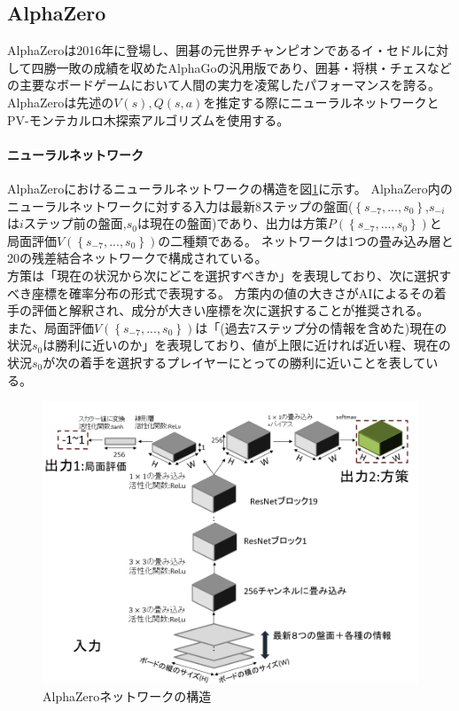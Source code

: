 \subsection{AlphaZero}
AlphaZeroは2016年に登場し、囲碁の元世界チャンピオンであるイ・セドルに対して四勝一敗の成績を収めたAlphaGoの汎用版であり、囲碁・将棋・チェスなどの主要なボードゲームにおいて人間の実力を凌駕したパフォーマンスを誇る。
AlphaZeroは先述の$V(s),Q(s, a)$を推定する際にニューラルネットワークとPV-モンテカルロ木探索アルゴリズムを使用する。
\paragraph{ニューラルネットワーク}
AlphaZeroにおけるニューラルネットワークの構造を図\ref{fig:network}に示す。
AlphaZero内のニューラルネットワークに対する入力は最新$8$ステップの盤面($\left\{ s_{-7}, ..., s_0 \right\}$,$s_{-i}$は$i$ステップ前の盤面,$s_{0}$は現在の盤面)であり、出力は方策$P(\left\{ s_{-7}, ..., s_0 \right\})$と
局面評価$V(\left\{ s_{-7}, ..., s_0 \right\})$の二種類である。
ネットワークは1つの畳み込み層と20の残差結合ネットワークで構成されている。  \\
方策は「現在の状況から次にどこを選択すべきか」を表現しており、次に選択すべき座標を確率分布の形式で表現する。
方策内の値の大きさがAIによるその着手の評価と解釈され、成分が大きい座標を次に選択することが推奨される。\\
また、局面評価$V(\left\{ s_{-7}, ..., s_0 \right\})$は「(過去7ステップ分の情報を含めた)現在の状況$s_0$は勝利に近いのか」を表現しており、値が上限に近ければ近い程、現在の状況$s_0$が次の着手を選択するプレイヤーにとっての勝利に近いことを表している。
\begin{figure}[t]
	\centering
	\includegraphics[width=\linewidth]{./figure/network.png}
	\caption{AlphaZeroネットワークの構造}
	\label{fig:network}
\end{figure}
